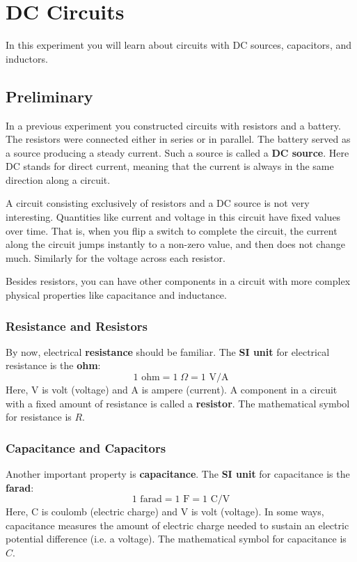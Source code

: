 \setcounter{chapter}{4}
\chapter{DC Circuits}
%
In this experiment you will learn about circuits with DC sources, capacitors, and inductors.
%
\section{Preliminary}
%
In a previous experiment you constructed circuits with resistors and a battery. The resistors were connected either in series or in parallel. The battery served as a source producing a steady current. Such a source is called a \textbf{DC source}. Here DC stands for direct current, meaning that the current is always in the same direction along a circuit.

A circuit consisting exclusively of resistors and a DC source is not very interesting. Quantities like current and voltage in this circuit have fixed values over time. That is, when you flip a switch to complete the circuit, the current along the circuit jumps instantly to a non-zero value, and then does not change much. Similarly for the voltage across each resistor.

Besides resistors, you can have other components in a circuit with more complex physical properties like capacitance and inductance.
%
\subsection{Resistance and Resistors}
%
By now, electrical \textbf{resistance} should be familiar. The \textbf{SI unit} for electrical resistance is the \textbf{ohm}:
\begin{equation}
	1 \text{ ohm} = 1\;\Omega = 1 \text{ V/A}
\end{equation}
Here, V is volt (voltage) and A is ampere (current). A component in a circuit with a fixed amount of resistance is called a \textbf{resistor}. The mathematical symbol for resistance is $R$.
%
\subsection{Capacitance and Capacitors}
%
Another important property is \textbf{capacitance}. The \textbf{SI unit} for capacitance is the \textbf{farad}:
\begin{equation}
	1 \text{ farad} = 1 \text{ F} = 1 \text{ C/V}
\end{equation}
Here, C is coulomb (electric charge) and V is volt (voltage). In some ways, capacitance measures the amount of electric charge needed to sustain an electric potential difference (i.e. a voltage). The mathematical symbol for capacitance is $C$.

